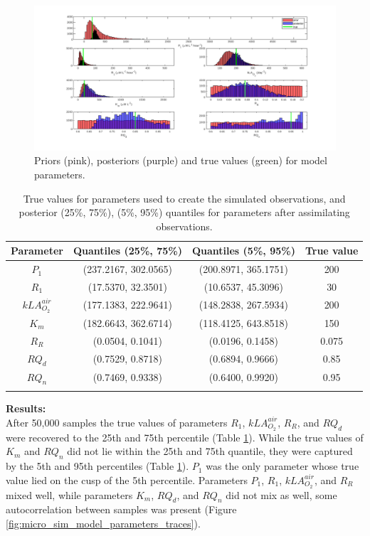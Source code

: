 \documentclass{ruthesis}
\begin{document}
\begin{figure}
	\centerline{\includegraphics[width=1.3\textwidth]{images_microalgae/posterior_plots_with_fake_data/model_parameters}}
	\caption[.]{Priors (pink), posteriors (purple) and true values (green) for model parameters.}
	\label{fig:pos_sim_model_parameters}
\end{figure}


\begin{longtable}{|c|c|c|c|} 
		\hline
		\bfseries{Parameter}  & \bfseries{Quantiles (25\%, 75\%)}  & \bfseries{Quantiles (5\%, 95\%)} &  \bfseries{True value} \\ \hline
		$P_1$ 				& (237.2167, 302.0565) 	& (200.8971, 365.1751) 	&  200  \\ 
		$R_1$ 				& (17.5370, 32.3501) 	& (10.6537, 45.3096)	& 	30 \\ 
		$kLA_{O_2}^{air}$ 	& (177.1383, 222.9641)  & (148.2838, 267.5934)  &  200 \\
		$K_m$ 				& (182.6643, 362.6714) 	& (118.4125, 643.8518) 	&  150 \\ 
		$R_R$ 				& (0.0504, 0.1041) 		& (0.0196, 0.1458) 		& 0.075 \\
		$RQ_d$ 				& (0.7529, 0.8718) 		& (0.6894, 0.9666) 		& 0.85 \\	
		$RQ_n$ 				& (0.7469, 0.9338) 		& (0.6400, 0.9920) 		& 0.95 \\	
		\hline
		\caption[.]{True values for parameters used to create the simulated observations, and posterior (25\%, 75\%), (5\%, 95\%) quantiles for parameters after assimilating observations.}	
		\label{table:micro_parameters_sim}
\end{longtable}

\textbf{Results:}\\
After 50,000 samples the true values of parameters $R_1$, $kLA_{O_2}^{air}$, $R_R$, and $RQ_d$ were recovered to the 25th and 75th percentile (Table \ref{table:micro_parameters_sim}). While the true values of $K_m$ and $RQ_n$ did not lie within the 25th and 75th quantile, they were captured by the 5th and 95th percentiles (Table \ref{table:micro_parameters_sim}). $P_1$ was the only parameter whose true value lied on the cusp of the 5th percentile. Parameters $P_1$, $R_1$, $kLA_{O_2}^{air}$, and $R_R$ mixed well, while parameters $K_m$, $RQ_d$, and $RQ_n$ did not mix as well, some autocorrelation between samples was present (Figure \ref{fig:micro_sim_model_parameters_traces}).
\end{document}
